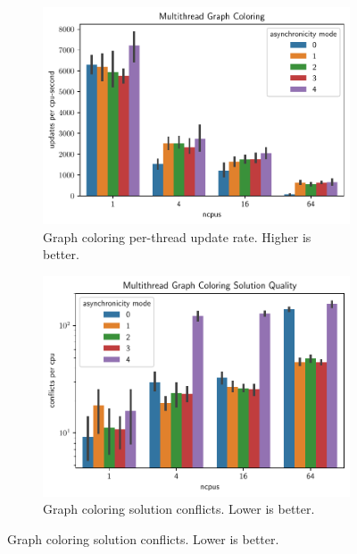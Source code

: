   \begin{figure}[thpb]
      \centering
    \begin{subfigure}[b]{\linewidth}
      \centering
      \includegraphics[width=\linewidth]{chart/multithread-graph-coloring}
     \caption{Graph coloring per-thread update rate. Higher is better.}
         \label{fig:multithread_graph_coloring_update_rate}
      \end{subfigure}
      
    \begin{subfigure}[b]{\linewidth}
      \centering
      \includegraphics[width=\linewidth]{chart/multithread-graph-coloring-solution-quality}      
      \caption{Graph coloring solution conflicts. Lower is better.}
         \label{fig:multithread_graph_coloring_solution_quality}
    \end{subfigure}
    

\end{figure}

